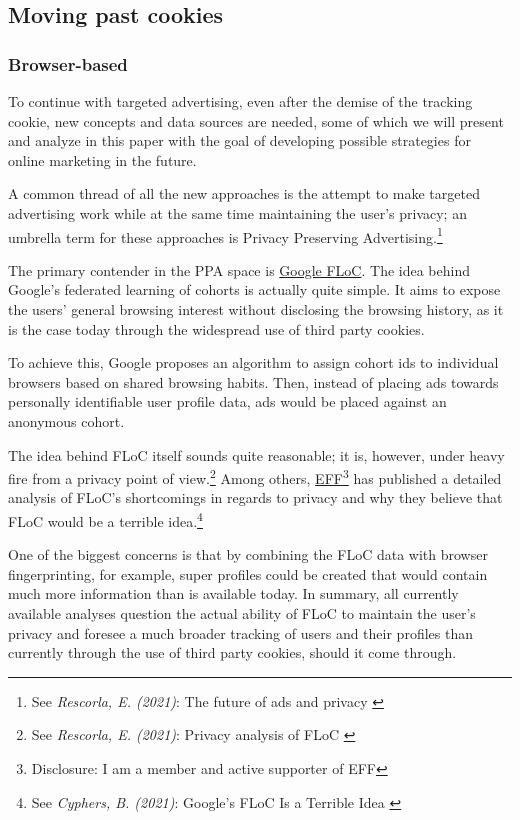 \subsection{Moving past cookies}

\subsubsection{Browser-based}

To continue with targeted advertising, even after the demise of the tracking cookie, new concepts and data sources are needed, some of which we will present and analyze in this paper with the goal of developing possible strategies for online marketing in the future.

A common thread of all the new approaches is the attempt to make targeted advertising work while at the same time maintaining the user's privacy; an umbrella term for these approaches is Privacy Preserving Advertising.\footnote{See \textit{Rescorla, E. (2021)}: The future of ads and privacy \cite{futureAds}}

The primary contender in the PPA space is \href{https://wicg.github.io/floc/}{Google FLoC}. The idea behind Google's federated learning of cohorts is actually quite simple. It aims to expose the users' general browsing interest without disclosing the browsing history, as it is the case today through the widespread use of third party cookies.

To achieve this, Google proposes an algorithm to assign cohort ids to individual browsers based on shared browsing habits. Then, instead of placing ads towards personally identifiable user profile data, ads would be placed against an anonymous cohort. 

The idea behind FLoC itself sounds quite reasonable; it is, however, under heavy fire from a privacy point of view.\footnote{See \textit{Rescorla, E. (2021)}: Privacy analysis of FLoC \cite{privacyFloc}} Among others, \href{https://www.eff.org/}{EFF}\footnote{Disclosure: I am a member and active supporter of EFF} has published a detailed analysis of FLoC's shortcomings in regards to privacy and why they believe that FLoC would be a terrible idea.\footnote{See \textit{Cyphers, B. (2021)}: Google’s FLoC Is a Terrible Idea \cite{terribleIdea}}

One of the biggest concerns is that by combining the FLoC data with browser fingerprinting, for example, super profiles could be created that would contain much more information than is available today. In summary, all currently available analyses question the actual ability of FLoC to maintain the user's privacy and foresee a much broader tracking of users and their profiles than currently through the use of third party cookies, should it come through.

